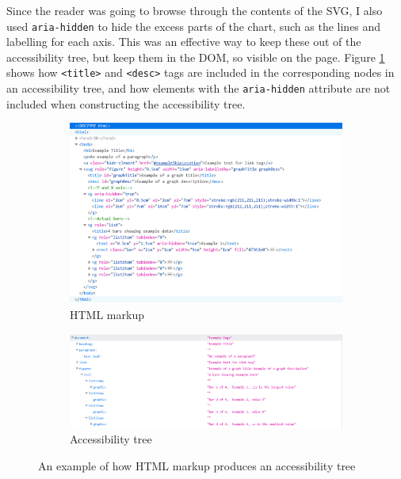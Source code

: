 \documentclass[ %
                    author={Aleena Baig},
                supervisor={Dr Simon Lock},
                    degree={BSc},
                     title={On Making Web Accessible Graphs},
                  subtitle={},
                      year={2019} ]{dissertation}
\begin{document}
Since the reader was going to browse through the contents of the SVG, I also used \texttt{aria-hidden} to hide the excess parts of the chart, such as the lines and labelling for each axis. This was an effective way to keep these out of the accessibility tree, but keep them in the DOM, so visible on the page. Figure \ref{fig:HTMLATComparison} shows how \texttt{<title>} and \texttt{<desc>} tags are included in the corresponding nodes in an accessibility tree, and how elements with the \texttt{aria-hidden} attribute are not included when constructing the accessibility tree.

\begin{figure}[h]
  \centering
  \begin{subfigure}[b]{0.8\textwidth}
    \centering
    \includegraphics[width=\linewidth]{images/ExampleHTML.PNG}
     \caption{HTML markup}
  \end{subfigure}
  \begin{subfigure}[b]{0.8\textwidth}
    \centering
    \includegraphics[width=\linewidth]{images/ExampleAccessibilityTree.PNG}
    \caption{Accessibility tree}
  \end{subfigure}
  \caption{An example of how HTML markup produces an accessibility tree}
  \label{fig:HTMLATComparison}
\end{figure}
\end{document}
